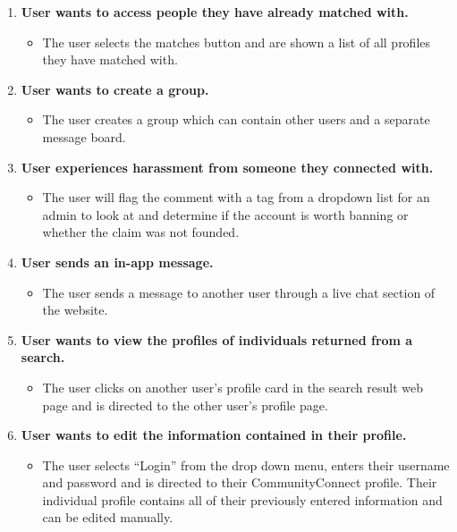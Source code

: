 \documentclass[12pt]{article}
\begin{document}
\begin{enumerate}
    \item \textbf{User wants to access people they have already matched with.}
      \begin{itemize}
        \item The user selects the matches button and are shown a list of all profiles they have matched with.
      \end{itemize}

    \item \textbf{User wants to create a group.}
      \begin{itemize}
        \item The user creates a group which can contain other users and a separate message board.
      \end{itemize}

    \item \textbf{User experiences harassment from someone they connected with.}
      \begin{itemize}
        \item The user will flag the comment with a tag from a dropdown list for an admin to look at and determine if the account is worth banning or whether the claim was not founded.
      \end{itemize}

    \item \textbf{User sends an in-app message.}
      \begin{itemize}
        \item The user sends a message to another user through a live chat section of the website.
      \end{itemize}

    \item \textbf{User wants to view the profiles of individuals returned from a search.}
      \begin{itemize}
        \item The user clicks on another user’s profile card in the search result web page and is directed to the other user’s profile page.
      \end{itemize}

    \item \textbf{User wants to edit the information contained in their profile.}
      \begin{itemize}
        \item The user selects “Login” from the drop down menu, enters their username and password and is directed to their CommunityConnect profile. Their individual profile contains all of their previously entered information and can be edited manually.
      \end{itemize}


\end{enumerate}
\end{document}
